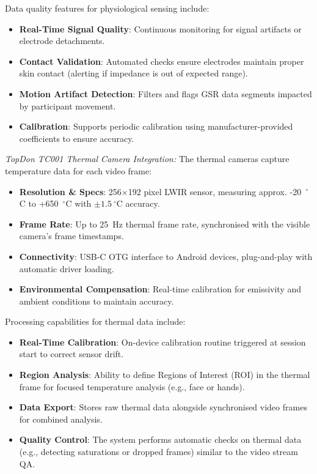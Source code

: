 \documentclass[11pt,a4paper]{report}
\begin{document}
{Data quality features for physiological sensing include:

\begin{itemize}
    \item \textbf{Real-Time Signal Quality}: Continuous monitoring for signal artifacts or electrode detachments.
    \item \textbf{Contact Validation}: Automated checks ensure electrodes maintain proper skin contact (alerting if impedance is out of expected range).
    \item \textbf{Motion Artifact Detection}: Filters and flags GSR data segments impacted by participant movement.
    \item \textbf{Calibration}: Supports periodic calibration using manufacturer-provided coefficients to ensure accuracy.
\end{itemize}

\emph{TopDon TC001 Thermal Camera Integration:} The thermal cameras capture temperature data for each video frame:

\begin{itemize}
    \item \textbf{Resolution \& Specs}: 256$\times$192 pixel LWIR sensor, measuring approx. -20~$^\circ$C to +650~$^\circ$C with $\pm1.5~^\circ$C accuracy.
    \item \textbf{Frame Rate}: Up to 25~Hz thermal frame rate, synchronised with the visible camera's frame timestamps.
    \item \textbf{Connectivity}: USB-C OTG interface to Android devices, plug-and-play with automatic driver loading.
    \item \textbf{Environmental Compensation}: Real-time calibration for emissivity and ambient conditions to maintain accuracy.
\end{itemize}

Processing capabilities for thermal data include:

\begin{itemize}
    \item \textbf{Real-Time Calibration}: On-device calibration routine triggered at session start to correct sensor drift.
    \item \textbf{Region Analysis}: Ability to define Regions of Interest (ROI) in the thermal frame for focused temperature analysis (e.g., face or hands).
    \item \textbf{Data Export}: Stores raw thermal data alongside synchronised video frames for combined analysis.
    \item \textbf{Quality Control}: The system performs automatic checks on thermal data (e.g., detecting saturations or dropped frames) similar to the video stream QA.
\end{itemize}

}
\end{document}

